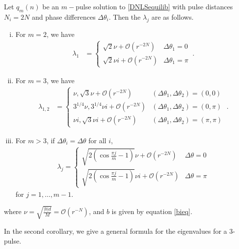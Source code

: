 \documentclass[thesis.tex]{subfiles}
\begin{document}
\begin{corollary}\label{DNLSeigcorr}Let $q_m(n)$ be an $m-$pulse solution to \cref{DNLSequilib} with pulse distances $N_i = 2N$ and phase differences $\Delta\theta_i$. Then the $\lambda_j$ are as follows.
\begin{enumerate}[(i)]
\item For $m = 2$, we have
\begin{align}\label{2pulseeigs}
\lambda_1 &= 
\begin{cases}
\sqrt{2}\nu  + \mathcal{O}(r^{-2N}) & \Delta\theta_1 = 0 \\
\sqrt{2}\nu i + \mathcal{O}(r^{-2N}) & \Delta\theta_1 = \pi
\end{cases} \:.
\end{align}
\item For $m = 3$, we have
\begin{align}\label{3pulseequaleigs}
\lambda_{1, 2} &= \begin{cases}
\nu, \sqrt{3} \nu + \mathcal{O}(r^{-2N}) & (\Delta\theta_1, \Delta\theta_2) = (0, 0) \\
3^{1/4}\nu, 3^{1/4}\nu i + \mathcal{O}(r^{-2N}) & (\Delta\theta_1, \Delta\theta_2) = (0, \pi) \\
\nu i, \sqrt{3} \nu i + \mathcal{O}(r^{-2N}) & (\Delta\theta_1, \Delta\theta_2) = (\pi, \pi)
\end{cases}\:.
\end{align}
\item For $m > 3$, if $\Delta\theta_i = \Delta\theta$ for all $i$,
\begin{align*}
\lambda_j = \begin{cases}
\sqrt{2\left( \cos\frac{\pi j}{m} - 1 \right)}\nu + \mathcal{O}(r^{-2N}) & \Delta\theta = 0 \\
\sqrt{2\left( \cos\frac{\pi j}{m} - 1 \right)}\nu i + \mathcal{O}(r^{-2N}) & \Delta\theta = \pi
\end{cases}
\end{align*}
for $j = 1, \dots, m-1$.
\end{enumerate}
where $\nu = \sqrt{\frac{|b|d}{M}} = \mathcal{O}(r^{-N})$, and $b$ is given by equation \cref{bieq}.
\end{corollary}

In the second corollary, we give a general formula for the eigenvalues for a 3-pulse.
\end{document}

